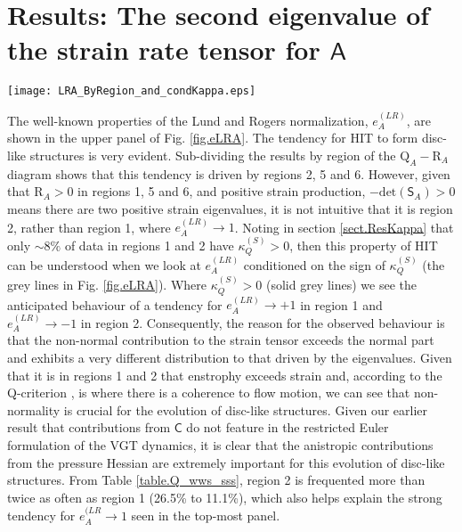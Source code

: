\documentclass[preprint,amssymb,amsmath,aip,cha]{revtex4-1}
\begin{document}
\section{Results: The second eigenvalue of the strain rate tensor for $\mathsf{A}$}
\label{sect.res_eLRA}
\begin{figure*}
  \texttt{[image: LRA\_ByRegion\_and\_condKappa.eps]}
\caption{Probability curves for $e^{(LR)}_{A}$ for all the data (top panel) and then by each region of the $\mbox{Q}_{A}-\mbox{R}_{A}$ diagram (black lines). We also show results conditioned on the sign of $\kappa_{Q}^{(S)}$, with $\kappa_{Q}^{(S)} > 0$ as a grey solid line and $\kappa_{Q}^{(S)} < 0$ as a grey dashed line.
}
\label{fig.eLRA}       %
\end{figure*}
The well-known properties of the Lund and Rogers normalization, $e^{(LR)}_{A}$, are shown in the upper panel of Fig. \ref{fig.eLRA}. The tendency for HIT to form disc-like structures is very evident. Sub-dividing the results by region of the $\mbox{Q}_{A}-\mbox{R}_{A}$ diagram shows that this tendency is driven by regions 2, 5 and 6. However, given that $\mbox{R}_{A} > 0$ in regions 1, 5 and 6, and positive strain production, $-\mbox{det}(\mathsf{S}_{A}) > 0$ means there are two positive strain eigenvalues, it is not intuitive that it is region 2, rather than region 1,  where $e^{(LR)}_{A} \to 1$. Noting in section \ref{sect.ResKappa} that only $\sim 8\%$ of data in regions 1 and 2 have $\kappa_{Q}^{(S)} > 0$, then this property of HIT can be understood when we look at $e^{(LR)}_{A}$ conditioned on the sign of $\kappa_{Q}^{(S)}$ (the grey lines in Fig. \ref{fig.eLRA}). Where $\kappa_{Q}^{(S)} > 0$ (solid grey lines) we see the anticipated behaviour of a tendency for $e^{(LR)}_{A} \to +1$ in region 1 and $e^{(LR)}_{A} \to -1$ in region 2. Consequently, the reason for the observed behaviour is that the non-normal contribution to the strain tensor exceeds the normal part and exhibits a very different distribution to that driven by the eigenvalues. Given that it is in regions 1 and 2 that enstrophy exceeds strain and, according to the Q-criterion \citep{hunt88, dubief00}, is where there is a coherence to flow motion, we can see that non-normality is crucial for the evolution of disc-like structures. Given our earlier result that contributions from $\mathsf{C}$ do not feature in the restricted Euler formulation of the VGT dynamics, it is clear that the anistropic contributions from the pressure Hessian are extremely important for this evolution of disc-like structures. From Table \ref{table.Q_wws_sss}, region 2 is frequented more than twice as often as region 1 (26.5\% to 11.1\%), which also helps explain the strong tendency for $e^{(LR}_{A} \to 1$ seen in the top-most panel. 
\end{document}
